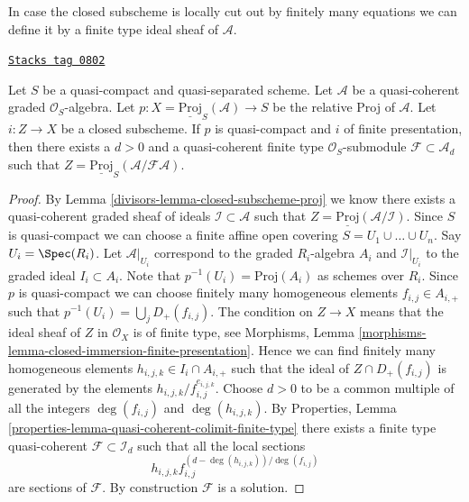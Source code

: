 In case the closed subscheme is locally cut out by finitely many
equations we can define it by a finite type ideal sheaf of
$\mathcal{A}$.

\begin{lemma}
\label{divisors-lemma-closed-subscheme-proj-finite}
\href{https://stacks.math.columbia.edu/tag/0802}{\texttt{Stacks tag 0802}}

Let $S$ be a quasi-compact and quasi-separated scheme.
Let $\mathcal{A}$ be a quasi-coherent graded $\mathcal{O}_S$-algebra. Let
$p : X = \underline{\text{Proj}}_S(\mathcal{A}) \to S$ be the relative
Proj of $\mathcal{A}$. Let $i : Z \to X$ be a closed subscheme.
If $p$ is quasi-compact and $i$ of finite presentation, then there exists
a $d > 0$ and a quasi-coherent finite type $\mathcal{O}_S$-submodule
$\mathcal{F} \subset \mathcal{A}_d$ such that
$Z = \underline{\text{Proj}}_S(\mathcal{A}/\mathcal{F}\mathcal{A})$.
\end{lemma}

\begin{proof}

By Lemma \ref{divisors-lemma-closed-subscheme-proj} we know there exists a
quasi-coherent graded sheaf of ideals $\mathcal{I} \subset \mathcal{A}$
such that $Z = \underline{\text{Proj}}(\mathcal{A}/\mathcal{I})$.
Since $S$ is quasi-compact we can choose a finite affine open covering
$S = U_1 \cup \ldots \cup U_n$. Say $U_i = \Spec(R_i)$. Let
$\mathcal{A}|_{U_i}$ correspond to the graded $R_i$-algebra $A_i$ and
$\mathcal{I}|_{U_i}$ to the graded ideal $I_i \subset A_i$. Note that
$p^{-1}(U_i) = \text{Proj}(A_i)$ as schemes over $R_i$.
Since $p$ is quasi-compact we can choose finitely many homogeneous
elements $f_{i, j} \in A_{i, +}$ such that
$p^{-1}(U_i) = \bigcup_j D_{+}(f_{i, j})$.
The condition on $Z \to X$ means that the ideal sheaf of $Z$ in
$\mathcal{O}_X$ is of finite type, see
Morphisms, Lemma \ref{morphisms-lemma-closed-immersion-finite-presentation}.
Hence we can find finitely many homogeneous elements
$h_{i, j, k} \in I_i \cap A_{i, +}$ such that the ideal of
$Z \cap D_{+}(f_{i, j})$ is generated by the elements
$h_{i, j, k}/f_{i, j}^{e_{i, j, k}}$. Choose $d > 0$ to be a common multiple
of all the integers $\deg(f_{i, j})$ and $\deg(h_{i, j, k})$.
By Properties, Lemma \ref{properties-lemma-quasi-coherent-colimit-finite-type}
there exists a finite type quasi-coherent $\mathcal{F} \subset \mathcal{I}_d$
such that all the local sections
$$
h_{i, j, k}f_{i, j}^{(d - \deg(h_{i, j, k}))/\deg(f_{i, j})}
$$
are sections of $\mathcal{F}$. By construction $\mathcal{F}$ is a solution.
\end{proof}

